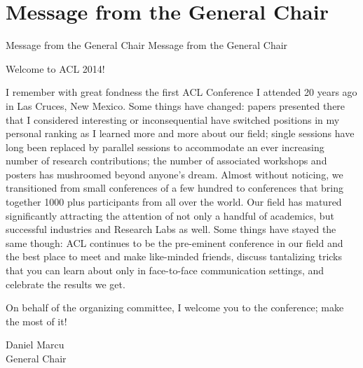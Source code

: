\section{Message from the General Chair}\vspace{2em}
\setheaders%
    {Message from the General Chair}%
    {Message from the General Chair}
\thispagestyle{emptyheader}
\begin{large}
\setlength{\parskip}{1ex}

\noindent Welcome to ACL 2014!

I remember with great fondness the first ACL Conference I attended 20 years ago in Las Cruces, New Mexico. Some things have changed: papers presented there that I considered interesting or inconsequential have switched positions in my personal ranking as I learned more and more about our field; single sessions have long been replaced by parallel sessions to accommodate an ever increasing number of research contributions; the number of associated workshops and posters has mushroomed beyond anyone's dream. Almost without noticing, we transitioned from small conferences of a few hundred to conferences that bring together 1000 plus participants from all over the world.  Our field has matured significantly attracting the attention of not only a handful of academics, but successful industries and Research Labs as well.  Some things have stayed the same though: ACL continues to be the pre-eminent conference in our field and the best place to meet and make like-minded friends, discuss tantalizing tricks that you can learn about only in face-to-face communication settings, and celebrate the results we get.

On behalf of the organizing committee, I welcome you to the conference; make the most of it!

\vspace{.2in}
Daniel Marcu \\
\indent General Chair
\end{large}

